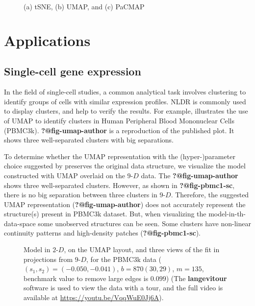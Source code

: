 \documentclass[
  12pt]{article}
\newcommand\gD{$2\text{-}D$}
\begin{document}
\begin{figure}[H]


\caption{\label{fig-five-gau-projs}(a) tSNE, (b) UMAP, and (c) PaCMAP}

\end{figure}%

\section{Applications}\label{sec-applications}

\subsection{Single-cell gene
expression}\label{single-cell-gene-expression}

In the field of single-cell studies, a common analytical task involves
clustering to identify groups of cells with similar expression profiles.
NLDR is commonly used to display clusters, and help to verify the
results. For example, \citet{chen2023} illustrates the use of UMAP to
identify clusters in Human Peripheral Blood Mononuclear Cells (PBMC3k).
\textbf{?@fig-umap-author} is a reproduction of the published plot. It
shows three well-separated clusters with big separations.

To determine whether the UMAP representation with the (hyper-)parameter
choice suggested by \citet{chen2023} preserves the original data
structure, we visualize the model constructed with UMAP overlaid on the
\(9\text{-}D\) data. The \textbf{?@fig-umap-author} shows three
well-separated clusters. However, as shown in \textbf{?@fig-pbmc1-sc},
there is no big separation between three clusters in \(9\text{-}D\).
Therefore, the suggested UMAP representation
(\textbf{?@fig-umap-author}) does not accurately represent the
structure(s) present in PBMC3k dataset. But, when visualizing the
model-in-th-data-space some unobserved structures can be seen. Some
clusters have non-linear continuity patterns and high-density patches
(\textbf{?@fig-pbmc1-sc}).

\begin{figure}[H]


\caption{\label{fig-model-pbmc-author-proj}Model in \gD{}, on the UMAP
layout, and three views of the fit in projections from \(9\text{-}D\),
for the PBMC3k data (\((s_1,  s_2) = (-0.050,  -0.041)\),
\(b = 870   (30,  29)\), \(m = 135\), benchmark value to remove large
edges is \(0.099\)) (The \textbf{langevitour} software is used to view
the data with a tour, and the full video is available at
\url{https://youtu.be/VqqWuE0Jj6A}).}

\end{figure}%
\end{document}
